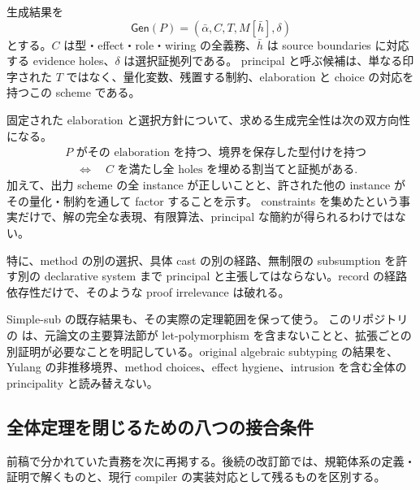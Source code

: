 \documentclass[11pt,a4paper]{article}
\theoremstyle{remark}
\newcommand{\newsrc}[2]{\href{https://github.com/momota1029/yulang/blob/d5552b3e328e53c3a60170329cd2192e4e11c097/#1}{\detokenize{#2}}}
\begin{document}
生成結果を
\[
\mathsf{Gen}(P)=(\bar\alpha,C,T,M[\bar h],\delta)
\]
とする。$C$ は型・effect・role・wiring の全義務、$\bar h$ は source boundaries に対応する evidence holes、$\delta$ は選択証拠列である。
principal と呼ぶ候補は、単なる印字された $T$ ではなく、量化変数、残置する制約、elaboration と choice の対応を持つこの scheme である。

固定された elaboration と選択方針について、求める生成完全性は次の双方向性になる。
\[
\begin{aligned}
&\text{$P$ がその elaboration を持つ、境界を保存した型付けを持つ}\\
&\quad\Longleftrightarrow\quad
\text{$C$ を満たし全 holes を埋める割当てと証拠がある}.
\end{aligned}
\]
加えて、出力 scheme の全 instance が正しいことと、許された他の instance がその量化・制約を通して factor することを示す。
constraints を集めたという事実だけで、解の完全な表現、有限算法、principal な簡約が得られるわけではない。

特に、method の別の選択、具体 cast の別の経路、無制限の subsumption を許す別の declarative system まで principal と主張してはならない。record の経路依存性だけで、そのような proof irrelevance は破れる。

Simple-sub の既存結果も、その実際の定理範囲を保って使う。
このリポジトリの
\newsrc{notes/theory/2026-10-11-parreaux-simple-sub-proof-import.md}{Simple-sub proof import}
は、元論文の主要算法節が let-polymorphism を含まないことと、拡張ごとの別証明が必要なことを明記している。original algebraic subtyping の結果を、Yulang の非推移境界、method choices、effect hygiene、intrusion を含む全体の principality と読み替えない。

\subsection{全体定理を閉じるための八つの接合条件}

前稿で分かれていた責務を次に再掲する。後続の改訂節では、規範体系の定義・証明で解くものと、現行 compiler の実装対応として残るものを区別する。
\end{document}
